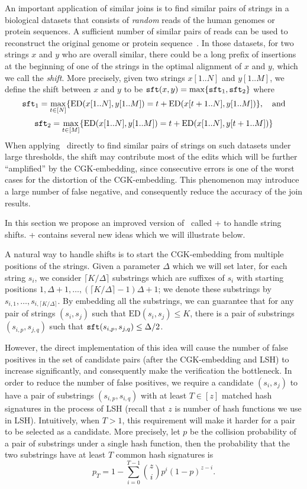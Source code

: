 An important application of similar joins is to find similar pairs of strings in a biological datasets that consists of {\em random} reads of the human genomes or protein sequences. A sufficient number of similar pairs of reads can be used to reconstruct the original genome or protein sequence~\cite{GYB10}.
In those datasets, for two strings $x$ and $y$ who are overall similar, there could be a long prefix of insertions at the beginning of one of the strings in the optimal alignment of $x$ and $y$, which we call the {\em shift}.  More precisely, given two strings $x[1..N]$ and $y[1..M]$, we define the shift between $x$ and $y$ to be ${\tt sft}(x, y) = \max\{{\tt sft}_1, {\tt sft}_2\}$ where 
$${\tt sft}_1 = \max_{t \in [N]}\{\text{ED}(x[1..N], y[1..M]) = t + \text{ED}(x[t+1..N], y[1..M])\},\quad \text{and}$$ 
$${\tt sft}_2 = \max_{t \in [M]}\{\text{ED}(x[1..N], y[1..M]) = t + \text{ED}(x[1..N], y[t+1..M])\}$$
When applying \ebdjoin\ directly to find similar pairs of strings on such datasets under large thresholds, the shift may contribute most of the edits which will be further ``amplified'' by the CGK-embedding, since consecutive errors is one of the worst cases for the distortion of the CGK-embedding.  This phenomenon may introduce a large number of false negative, and consequently reduce the accuracy of the join results.

In this section we propose an improved version of \ebdjoin\ called \ebdjoin+ to handle string shifts.  \ebdjoin+ contains several new ideas which we will illustrate below.

A natural way to handle shifts is to start the CGK-embedding from multiple positions of the strings.  Given a parameter $\Delta$ which we will set later, for each string $s_i$, we consider $\lceil K / \Delta \rceil$ substrings which are suffixes of $s_i$ with starting positions $1, \Delta+1, \ldots, (\lceil K/\Delta \rceil - 1)\Delta + 1$;  we denote these substrings by $s_{i,1}, \ldots, s_{i,{\lceil K/\Delta \rceil}}$.  By embedding all the substrings, we can guarantee that for any pair of strings $(s_i, s_j)$ such that $\text{ED}(s_i, s_j) \le K$, there is a pair of substrings $(s_{i,p}, s_{j,q})$ such that  ${\tt sft}(s_{i,p}, s_{j,q}) \le \Delta/2$.  

However, the direct implementation of this idea will cause the number of false positives in the set of candidate pairs (after the CGK-embedding and LSH) to increase significantly, and consequently make the verification the bottleneck.  In order to reduce the number of false positives, we require a candidate $(s_i, s_j)$ to have a pair of substrings $(s_{i,p}, s_{i,q})$ with at least $T \in [z]$ matched hash signatures in the process of LSH (recall that $z$ is number of hash functions we use in LSH).  Intuitively, when $T > 1$, this requirement will make it harder for a pair to be selected as a candidate.  More precisely, let $p$ be the collision probability of a pair of substrings under a single hash function, then the probability that the two substrings have at least $T$ common hash signatures is 
$$p_T = 1- \sum_{i=0}^{T-1} \binom zi p^{i} (1-p)^{z-i}.$$

